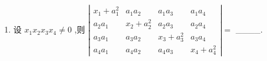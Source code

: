 \documentclass[12pt, a4paper, oneside, UTF8]{ctexbook}
\begin{document}
\begin{enumerate}[label=\arabic*.]
    \begin{align*}
    \left|\begin{array}{lll}
    a & a^2 & bc \\
    b & b^2 & a c \\
    c & c^2 & a b 
    \end{array}\right|=\_\_\_\_
    \end{align*}
    
    \begin{solution}
    \color{blue}
    \begin{align*}
    \text{原式} &\xlongequal{\text{第一列乘以(a+b+c)加到第三列}}\left|\begin{array}{lll}
    a & a^2 & a^2 + ac + ab + bc \\
    b & b^2 & a^2 + ac + ab + bc \\
    c & c^2 & a^2 + ac + ab + bc 
    \end{array}\right| \\
    &\xlongequal{\text{第二列乘-1加到最后一列,提取公因式,并交换}} (ab+ac+bc)\left|\begin{array}{lll}
    1 & a & a^2 \\
    1 & b & b^2 \\
    1 & c & c^2 
    \end{array}\right| \\
    &= (ac+bc+ab)(b-a)(c-a)(c-b)
    \end{align*}
    \end{solution}

    \item 设 \( {x}_{1}{x}_{2}{x}_{3}{x}_{4} \neq  0 \) ,则 
    \( \left| \begin{matrix} 
        {x}_{1}+{a}_{1}^{2}&{a}_{1}{a}_{2}&{a}_{1}{a}_{3} & {a}_{1}{a}_{4} \\  
        {a}_{2}{a}_{1} & {x}_{2} + {a}_{2}^{2} & {a}_{2}{a}_{3} & {a}_{2}{a}_{4} \\  
        {a}_{3}{a}_{1} & {a}_{3}{a}_{2} & {x}_{3} + {a}_{3}^{2} & {a}_{3}{a}_{4} \\  
        {a}_{4}{a}_{1} & {a}_{4}{a}_{2} & {a}_{4}{a}_{3} & {x}_{4} + {a}_{4}^{2} 
    \end{matrix}\right|  = \) \_\_\_\_.
    

\end{enumerate}
\end{document}
